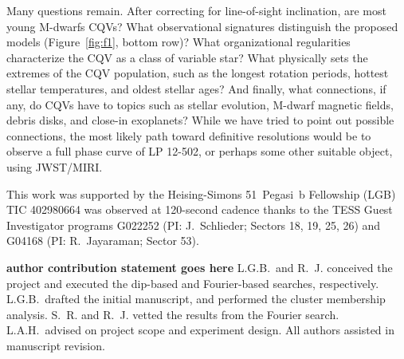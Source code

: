\documentclass[11pt,twocolumn,tighten]{aastex63}
\begin{document}
Many questions remain.  After correcting for line-of-sight
inclination, are most young M-dwarfs CQVs?  What observational
signatures distinguish the proposed models (Figure~\ref{fig:f1},
bottom row)?  What organizational regularities characterize the CQV as
a class of variable star?  What physically sets the extremes of the
CQV population, such as the longest rotation periods, hottest stellar
temperatures, and oldest stellar ages?  And finally, what connections,
if any, do CQVs have to topics such as stellar evolution, M-dwarf
magnetic fields, debris disks, and close-in exoplanets?  While we have
tried to point out possible connections, the most likely path toward
definitive resolutions would be to observe a full phase curve of LP
12-502, or perhaps some other suitable object, using JWST/MIRI.



\acknowledgments
This work was supported by the 
Heising-Simons 51~Pegasi~b Fellowship (LGB)
TIC 402980664 was observed at 120-second cadence thanks to the TESS Guest
Investigator programs G022252 (PI: J.~Schlieder; Sectors 18, 19, 25,
26) and G04168 (PI: R.~Jayaraman; Sector 53).

{\bf author contribution statement goes here}
L.G.B.~and R.~J. conceived the project and executed the
dip-based and Fourier-based searches, respectively.
L.G.B.~drafted the initial manuscript, and performed the cluster
membership analysis.
S.~R. and R.~J. vetted the results from the Fourier search.
L.A.H.~advised on project scope and experiment design.
All authors assisted in manuscript revision.

\end{document}
